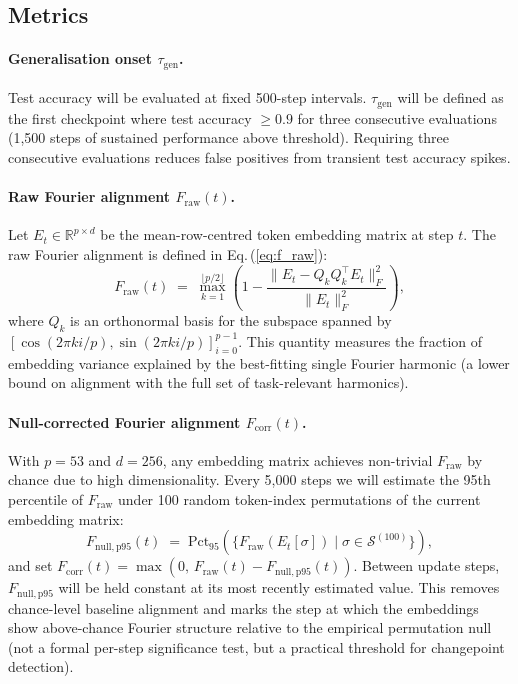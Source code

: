 \documentclass[12pt,openany,a4paper]{book}
\newcommand{\eq}[1]  {Eq.\,(\ref{#1})}
\newcommand{\taug}{\tau_{\mathrm{gen}}}
\newcommand{\fcorr}{F_{\mathrm{corr}}}
\begin{document}
\subsection{Metrics}

\paragraph{Generalisation onset $\taug$.}
Test accuracy will be evaluated at fixed 500-step intervals.
$\taug$ will be defined as the first checkpoint where test accuracy
$\geq 0.9$ for three consecutive evaluations (1{,}500 steps of
sustained performance above threshold).
Requiring three consecutive evaluations reduces false positives from
transient test accuracy spikes.

\paragraph{Raw Fourier alignment $F_{\mathrm{raw}}(t)$.}
Let $E_t \in \mathbb{R}^{p \times d}$ be the mean-row-centred token
embedding matrix at step $t$.
The raw Fourier alignment is defined in \eq{eq:f_raw}:
\begin{equation}
  F_{\mathrm{raw}}(t) \;=\;
  \max_{k=1}^{\lfloor p/2\rfloor}
  \!\left(1 - \frac{\|E_t - Q_k Q_k^\top E_t\|_F^2}
  {\|E_t\|_F^2}\right),
  \label{eq:f_raw}
\end{equation}
where $Q_k$ is an orthonormal basis for the subspace spanned by
$[\cos(2\pi k i/p),\sin(2\pi k i/p)]_{i=0}^{p-1}$.
This quantity measures the fraction of embedding variance explained
by the best-fitting single Fourier harmonic (a lower bound on
alignment with the full set of task-relevant harmonics).

\paragraph{Null-corrected Fourier alignment $\fcorr(t)$.}
With $p=53$ and $d=256$, any embedding matrix achieves non-trivial
$F_{\mathrm{raw}}$ by chance due to high dimensionality.
Every 5{,}000 steps we will estimate the 95th percentile of
$F_{\mathrm{raw}}$ under 100 random token-index permutations of the
current embedding matrix:
\begin{equation}
  F_{\mathrm{null,p95}}(t) \;=\;
  \mathrm{Pct}_{95}\!\left(
    \{F_{\mathrm{raw}}(E_t[\sigma]) \mid \sigma \in \mathcal{S}^{(100)}\}
  \right),
\end{equation}
and set $\fcorr(t) = \max(0,\, F_{\mathrm{raw}}(t) - F_{\mathrm{null,p95}}(t))$.
Between update steps, $F_{\mathrm{null,p95}}$ will be held constant at its
most recently estimated value.
This removes chance-level baseline alignment and marks the step at
which the embeddings show above-chance Fourier structure relative to
the empirical permutation null (not a formal per-step significance
test, but a practical threshold for changepoint detection).
\end{document}
